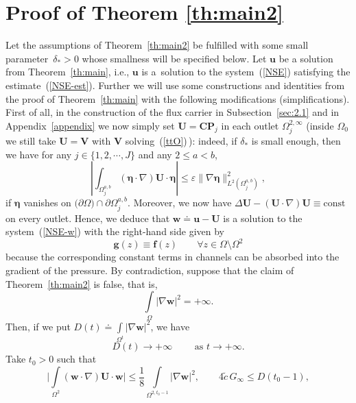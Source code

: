\documentclass[11pt]{article}
\numberwithin{equation}{section}
\numberwithin{figure}{section}
\def\const{{\mathrm{const}}}
\def\ue{{\mathbf u}}
\def\UU{{\mathbf U}}
\def\cc{{\tilde c}}
\def\bbe{{\boldsymbol{\eta}}}
\def\we{{\mathbf w}}
\begin{document}
\section{Proof of Theorem \ref{th:main2}}
\label{poet8}

Let the assumptions of Theorem~\ref{th:main2} be fulfilled with some small parameter~$\delta_*>0$ whose smallness will be specified below.
Let $\ue$ be a solution from Theorem~\ref{th:main}, i.e., $\ue$ is a~solution to the system~(\ref{NSE}) satisfying the estimate~(\ref{NSE-est}).
Further we will use some constructions and identities from the proof of Theorem~\ref{th:main} with the following modifications (simplifications).
First of all, in the construction of the flux carrier in Subsection~\ref{sec:2.1} and in Appendix~\ref{appendix}
we now simply set $\UU = \mathbf{CP}_j$ in each outlet $\Omega_j^{2, \infty}$ (inside $\Omega_0$ we still take $\UU = \mathbf{V}$ with $\mathbf{V}$ solving~(\ref{ttO})\,):
indeed, if $\delta_*$ is small enough, then we have  for any $j \in \{1,2,\cdots, J\}$ and any $2 \le a<b$,
\begin{equation}\label{HI-222}
	\left| \int_{ \Omega_j^{a,b}} (\bbe\cdot \nabla)\mathbf{U} \cdot \bbe \right|  \leq \varepsilon \| \nabla\bbe \|_{L^{2}( \Omega_j^{a,b})}^2,
\end{equation}
if $\bbe$ vanishes on $\bigl(\partial \Omega\bigr) \cap \partial \Omega_j^{a,b}$.
Moreover, we now have
$\Delta \mathbf{U} - (\mathbf{U} \cdot \nabla) \mathbf{U}\equiv\const$
on every outlet.
Hence, we deduce that $\we\doteq\ue-\UU$ is a solution to the system~(\ref{NSE-w}) with the right-hand side given by
\begin{equation}  \label{uni-8}
	\mathbf{g}(z)\equiv \mathbf{f}(z)\qquad\forall z\in\Omega\setminus\Omega^2
\end{equation}
because the corresponding constant terms in channels can be absorbed into the gradient of the pressure.
By contradiction, suppose that the claim of Theorem~\ref{th:main2} is false, that is,
$$
\int\limits_{\Omega}|\nabla\we|^2= +\infty.
$$
Then, if we put $D(t)\doteq\int\limits_{\Omega^t}|\nabla\we|^2$, we have
\begin{equation}  \label{uni-10}
	D(t)\to+\infty\qquad\mbox{ as \ }t\to+\infty.
\end{equation}
Take $t_0>0$ such that
\begin{equation}\label{uni-gg11}\biggl|\int\limits_{\Omega^2}(\mathbf{w} \cdot \nabla) \mathbf{U}\cdot\we\biggr|\le
\frac18\int\limits_{\Omega^{2,t_0-1}}|\nabla\we|^2,\qquad 4 \cc\, G_\infty\le D(t_0-1),
\end{equation}
\end{document}
